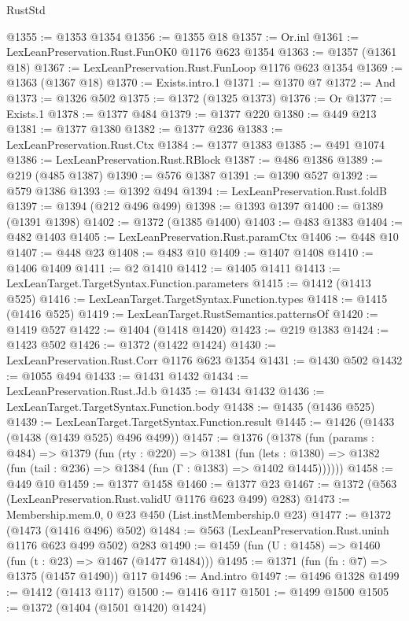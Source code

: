 \begin{lexlean}{RustStd}
\begin{coremodule}
@1355 := @1353 @1354
@1356 := @1355 @18
@1357 := Or.inl
@1361 := LexLeanPreservation.Rust.FunOK0 @1176 @623 @1354
@1363 := @1357 (@1361 @18)
@1367 := LexLeanPreservation.Rust.FunLoop @1176 @623 @1354
@1369 := @1363 (@1367 @18)
@1370 := Exists.intro.{1}
@1371 := @1370 @7
@1372 := And
@1373 := @1326 @502
@1375 := @1372 (@1325 @1373)
@1376 := Or
@1377 := Exists.{1}
@1378 := @1377 @484
@1379 := @1377 @220
@1380 := @449 @213
@1381 := @1377 @1380
@1382 := @1377 @236
@1383 := LexLeanPreservation.Rust.Ctx
@1384 := @1377 @1383
@1385 := @491 @1074
@1386 := LexLeanPreservation.Rust.RBlock
@1387 := @486 @1386
@1389 := @219 (@485 @1387)
@1390 := @576 @1387
@1391 := @1390 @527
@1392 := @579 @1386
@1393 := @1392 @494
@1394 := LexLeanPreservation.Rust.foldB
@1397 := @1394 (@212 @496 @499)
@1398 := @1393 @1397
@1400 := @1389 (@1391 @1398)
@1402 := @1372 (@1385 @1400)
@1403 := @483 @1383
@1404 := @482 @1403
@1405 := LexLeanPreservation.Rust.paramCtx
@1406 := @448 @10
@1407 := @448 @23
@1408 := @483 @10
@1409 := @1407 @1408
@1410 := @1406 @1409
@1411 := @2 @1410
@1412 := @1405 @1411
@1413 := LexLeanTarget.TargetSyntax.Function.parameters
@1415 := @1412 (@1413 @525)
@1416 := LexLeanTarget.TargetSyntax.Function.types
@1418 := @1415 (@1416 @525)
@1419 := LexLeanTarget.RustSemantics.patternsOf
@1420 := @1419 @527
@1422 := @1404 (@1418 @1420)
@1423 := @219 @1383
@1424 := @1423 @502
@1426 := @1372 (@1422 @1424)
@1430 := LexLeanPreservation.Rust.Corr @1176 @623 @1354
@1431 := @1430 @502
@1432 := @1055 @494
@1433 := @1431 @1432
@1434 := LexLeanPreservation.Rust.Jd.b
@1435 := @1434 @1432
@1436 := LexLeanTarget.TargetSyntax.Function.body
@1438 := @1435 (@1436 @525)
@1439 := LexLeanTarget.TargetSyntax.Function.result
@1445 := @1426 (@1433 (@1438 (@1439 @525) @496 @499))
@1457 := @1376
    (@1378
      (fun (params : @484) =>
      @1379
        (fun (rty : @220) =>
        @1381
          (fun (lets : @1380) =>
          @1382 (fun (tail : @236) => @1384 (fun (Γ : @1383) => @1402 @1445))))))
@1458 := @449 @10
@1459 := @1377 @1458
@1460 := @1377 @23
@1467 := @1372 (@563 (LexLeanPreservation.Rust.validU @1176 @623 @499) @283)
@1473 := Membership.mem.{0, 0} @23 @450 (List.instMembership.{0} @23)
@1477 := @1372 (@1473 (@1416 @496) @502)
@1484 := @563 (LexLeanPreservation.Rust.uninh @1176 @623 @499 @502) @283
@1490 := @1459 (fun (U : @1458) => @1460 (fun (t : @23) => @1467 (@1477 @1484)))
@1495 := @1371 (fun (fn : @7) => @1375 (@1457 @1490)) @117
@1496 := And.intro
@1497 := @1496 @1328
@1499 := @1412 (@1413 @117)
@1500 := @1416 @117
@1501 := @1499 @1500
@1505 := @1372 (@1404 (@1501 @1420) @1424)

\end{coremodule}
\end{lexlean}
